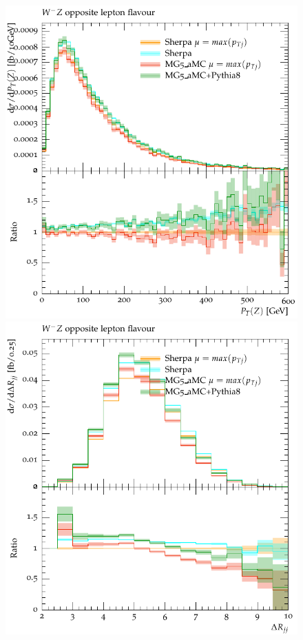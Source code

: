 \documentclass[11pt]{cernrep}
\begin{document}
\begin{figure}[htbp]
\begin{center}
   \includegraphics[scale=0.65]{figs/dyn_WmZ_OF_ZPt}
   \includegraphics[scale=0.65]{figs/dyn_WmZ_OF_dRjj}

\end{center}
\end{figure}
\end{document}
